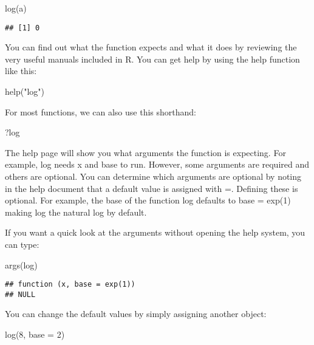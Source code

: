 \documentclass[
]{article}
\newenvironment{Shaded}{\begin{snugshade}}{\end{snugshade}}
\newcommand{\AttributeTok}[1]{\textcolor[rgb]{0.77,0.63,0.00}{#1}}
\newcommand{\DecValTok}[1]{\textcolor[rgb]{0.00,0.00,0.81}{#1}}
\newcommand{\FunctionTok}[1]{\textcolor[rgb]{0.00,0.00,0.00}{#1}}
\newcommand{\NormalTok}[1]{#1}
\newcommand{\StringTok}[1]{\textcolor[rgb]{0.31,0.60,0.02}{#1}}
\begin{document}
\begin{Shaded}
\begin{Highlighting}[]
\FunctionTok{log}\NormalTok{(a)}
\end{Highlighting}
\end{Shaded}

\begin{verbatim}
## [1] 0
\end{verbatim}

You can find out what the function expects and what it does by reviewing
the very useful manuals included in R. You can get help by using the
help function like this:

\begin{Shaded}
\begin{Highlighting}[]
\FunctionTok{help}\NormalTok{(}\StringTok{"log"}\NormalTok{)}
\end{Highlighting}
\end{Shaded}

For most functions, we can also use this shorthand:

\begin{Shaded}
\begin{Highlighting}[]
\NormalTok{?log}
\end{Highlighting}
\end{Shaded}

The help page will show you what arguments the function is expecting.
For example, log needs x and base to run. However, some arguments are
required and others are optional. You can determine which arguments are
optional by noting in the help document that a default value is assigned
with =. Defining these is optional. For example, the base of the
function log defaults to base = exp(1) making log the natural log by
default.

If you want a quick look at the arguments without opening the help
system, you can type:

\begin{Shaded}
\begin{Highlighting}[]
\FunctionTok{args}\NormalTok{(log)}
\end{Highlighting}
\end{Shaded}

\begin{verbatim}
## function (x, base = exp(1)) 
## NULL
\end{verbatim}

You can change the default values by simply assigning another object:

\begin{Shaded}
\begin{Highlighting}[]
\FunctionTok{log}\NormalTok{(}\DecValTok{8}\NormalTok{, }\AttributeTok{base =} \DecValTok{2}\NormalTok{)}
\end{Highlighting}
\end{Shaded}
\end{document}
